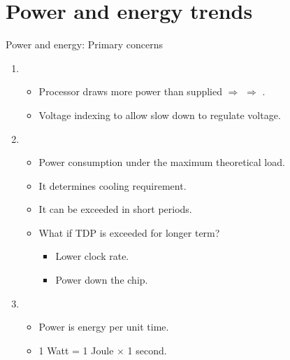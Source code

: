 \section{Power and energy trends}

\begin{frame}[t]{Power and energy: Primary concerns}
\begin{enumerate}
  \item {}
    \begin{itemize}
      \item Processor draws more power than supplied $\Rightarrow$ 
            $\Rightarrow$ .
      \item Voltage indexing to allow slow down to regulate voltage.
    \end{itemize}

  \item {}
    \begin{itemize}
      \item Power consumption under the maximum theoretical load.
      \item It determines cooling requirement.
      \item It can be exceeded in short periods.
      \item What if TDP is exceeded for longer term?
        \begin{itemize}
          \item Lower clock rate.
          \item Power down the chip.
        \end{itemize}
    \end{itemize}   

  \item {}
    \begin{itemize}
      \item Power is energy per unit time.
      \item 1 Watt = 1 Joule $\times$ 1 second.
    \end{itemize}
\end{enumerate}
\end{frame}

